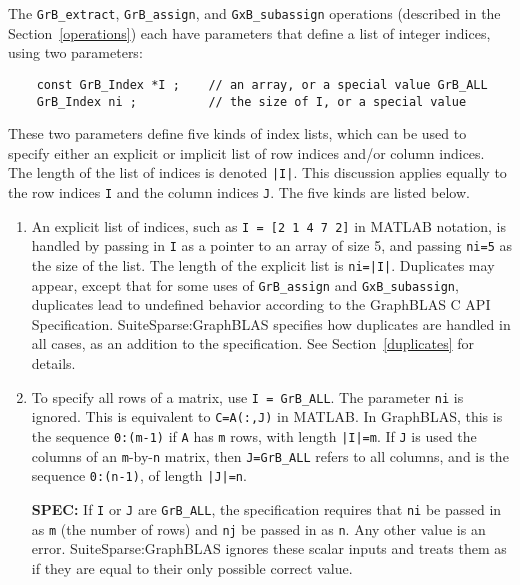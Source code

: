 \documentclass[12pt]{article}
\begin{document}
{The \verb'GrB_extract', \verb'GrB_assign', and \verb'GxB_subassign' operations
(described in the Section~\ref{operations}) each have parameters that define a
list of integer indices, using two parameters:

    \vspace{-0.05in}
    {\footnotesize
    \begin{verbatim}
    const GrB_Index *I ;    // an array, or a special value GrB_ALL
    GrB_Index ni ;          // the size of I, or a special value \end{verbatim}}

\vspace{-0.05in}
These two parameters define five kinds of index lists, which can be used to
specify either an explicit or implicit list of row indices and/or column
indices.  The length of the list of indices is denoted \verb'|I|'.  This
discussion applies equally to the row indices \verb'I' and the column indices
\verb'J'.  The five kinds are listed below.

\begin{enumerate}
\item
    An explicit list of indices, such as \verb'I = [2 1 4 7 2]' in MATLAB
    notation, is handled by passing in \verb'I' as a pointer to an array of
    size 5, and passing \verb'ni=5' as the size of the list.
    The length of the explicit list is \verb'ni=|I|'.
    Duplicates may appear, except that for some uses of \verb'GrB_assign'
    and \verb'GxB_subassign', duplicates lead to undefined behavior
    according to the GraphBLAS C API Specification.
    SuiteSparse:GraphBLAS specifies how duplicates are handled in all cases,
    as an addition to the specification.
    See Section~\ref{duplicates} for details.

\item To specify all rows of a matrix, use \verb'I = GrB_ALL'.  The
    parameter \verb'ni' is ignored.  This is equivalent to \verb'C=A(:,J)'
    in MATLAB.  In GraphBLAS, this is the sequence \verb'0:(m-1)' if \verb'A'
    has \verb'm' rows, with length \verb'|I|=m'.  If \verb'J' is used the
    columns of an \verb'm'-by-\verb'n' matrix, then \verb'J=GrB_ALL' refers to
    all columns, and is the sequence \verb'0:(n-1)', of length \verb'|J|=n'.

    \begin{alert}
    {\bf SPEC:} If \verb'I' or \verb'J' are \verb'GrB_ALL', the specification
    requires that \verb'ni' be passed in as \verb'm' (the number of rows)
    and \verb'nj' be passed in as \verb'n'.  Any other value is an error.
    SuiteSparse:GraphBLAS ignores these scalar inputs and treats them as if
    they are equal to their only possible correct value.
    \end{alert}


\end{enumerate}}
\end{document}
